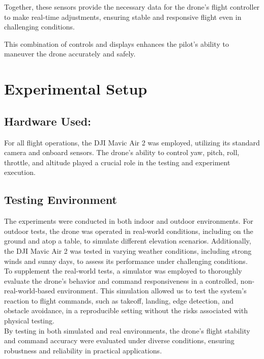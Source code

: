 \documentclass[unnumsec,webpdf,modern,large]{mam-authoring-template}%
\begin{document}
Together, these sensors provide the necessary data for the drone's flight controller to make real-time adjustments, ensuring stable and responsive flight even in challenging conditions.


This combination of controls and displays enhances the pilot's ability to maneuver the drone accurately and safely.


\section{Experimental Setup} \label{Experimental Setup}

\subsection{Hardware Used:}
For all flight operations, the DJI Mavic Air 2 was employed, utilizing its standard camera and onboard sensors. The drone's ability to control yaw, pitch, roll, throttle, and altitude played a crucial role in the testing and experiment execution. 

\subsection{Testing Environment}

The experiments were conducted in both indoor and outdoor environments. For outdoor tests, the drone was operated in real-world conditions, including on the ground and atop a table, to simulate different elevation scenarios. Additionally, the DJI Mavic Air 2 was tested in varying weather conditions, including strong winds and sunny days, to assess its performance under challenging conditions.\\
To supplement the real-world tests, a simulator was employed to thoroughly evaluate the drone’s behavior and command responsiveness in a controlled, non-real-world-based environment. This simulation allowed us to test the system's reaction to flight commands, such as takeoff, landing, edge detection, and obstacle avoidance, in a reproducible setting without the risks associated with physical testing.\\
By testing in both simulated and real environments, the drone's flight stability and command accuracy were evaluated under diverse conditions, ensuring robustness and reliability in practical applications.
\end{document}
